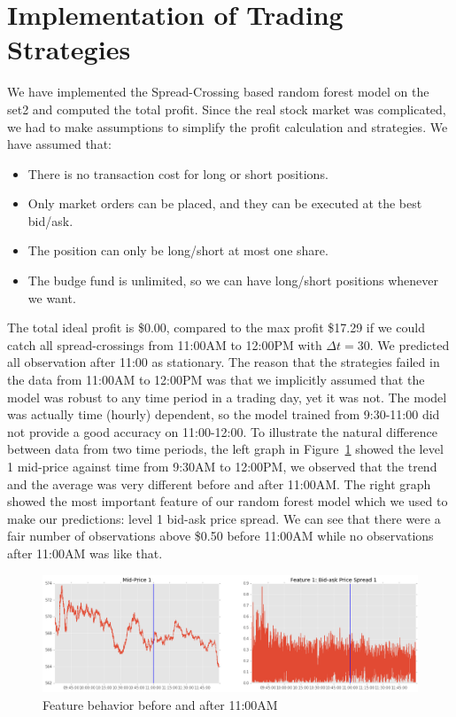 \documentclass[11pt]{article}
\begin{document}
\section{Implementation of Trading Strategies}
We have implemented the Spread-Crossing based random forest model on the set2 and computed the total profit. Since the real stock market was complicated, we had to make assumptions to simplify the profit calculation and strategies. We have assumed that:
\begin{itemize}
\item There is no transaction cost for long or short positions.
\item Only market orders can be placed, and they can be executed at the best bid/ask.
\item The position can only be long/short at most one share.
\item The budge fund is unlimited, so we can have long/short positions whenever we want.
\end{itemize}
The total ideal profit is \$0.00, compared to the max profit \$17.29 if we could catch all spread-crossings from 11:00AM to 12:00PM with $\Delta t=30$. We predicted all observation after 11:00 as stationary. The reason that the strategies failed in the data from 11:00AM to 12:00PM was that we implicitly assumed that the model was robust to any time period in a trading day, yet it was not. The model was actually time (hourly) dependent, so the model trained from 9:30-11:00 did not provide a good accuracy on 11:00-12:00. To illustrate the natural difference between data from two time periods, the left graph in Figure~\ref{fig:fea_11} showed the level 1 mid-price against time from 9:30AM to 12:00PM, we observed that the trend and the average was very different before and after 11:00AM. The right graph showed the most important feature of our random forest model which we used to make our predictions: level 1 bid-ask price spread. We can see that there were a fair number of observations above \$0.50 before 11:00AM while no observations after 11:00AM was like that. \\
\begin{figure}[H]
\centering
\includegraphics [width=0.9\linewidth,height=0.25\linewidth]{./figures/features_at11.png}
\caption{Feature behavior before and after 11:00AM}
\label{fig:fea_11}
\end{figure}
\end{document}
